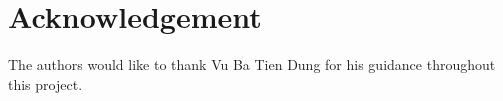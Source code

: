 \documentclass[conference,a4paper]{../../sty/IEEEtran}
\begin{document}
\section*{Acknowledgement}
The authors would like to thank Vu Ba Tien Dung for his guidance throughout this project.




\nocite*{}


\end{document}
